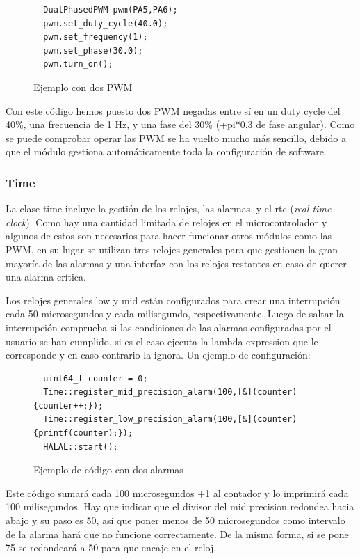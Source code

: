 \documentclass{report}
\begin{document}
\begin{figure}[h]
\begin{lstlisting}
  DualPhasedPWM pwm(PA5,PA6);
  pwm.set_duty_cycle(40.0);
  pwm.set_frequency(1);
  pwm.set_phase(30.0);
  pwm.turn_on();
\end{lstlisting}
\caption{Ejemplo con dos PWM}
  \label{PWMcode}
\end{figure}
\par \vspace{0.3 cm}
Con este código hemos puesto dos PWM negadas entre sí en un duty cycle del 40\%, una frecuencia de 1 Hz, y una fase del 30\% (+pi*0.3 de fase angular). Como se puede comprobar operar las PWM se ha vuelto mucho más sencillo, debido a que el módulo gestiona automáticamente toda la configuración de software.  

\subsubsection{Time}
La clase time incluye la gestión de los relojes, las alarmas, y el rtc (\textit{real time clock}). Como hay una cantidad limitada de relojes en el microcontrolador y algunos de estos son necesarios para hacer funcionar otros módulos como las PWM, en su lugar se utilizan tres relojes generales para que gestionen la gran mayoría de las alarmas y una interfaz con los relojes restantes en caso de querer una alarma crítica. \par
Los relojes generales low y mid están configurados para crear una interrupción cada 50 microsegundos y cada milisegundo, respectivamente. Luego de saltar la interrupción comprueba si las condiciones de las alarmas configuradas por el usuario se han cumplido, si es el caso ejecuta la lambda expression que le corresponde y en caso contrario la ignora. Un ejemplo de configuración:
\begin{figure}[h]
\begin{lstlisting}
  uint64_t counter = 0;
  Time::register_mid_precision_alarm(100,[&](counter){counter++;});
  Time::register_low_precision_alarm(100,[&](counter){printf(counter);});
  HALAL::start();
\end{lstlisting}
\caption{Ejemplo de código con dos alarmas}
  \label{Alarmcode}
\end{figure}
\par \vspace{0.3 cm}
Este código sumará cada 100 microsegundos +1 al contador y lo imprimirá cada 100 milisegundos. Hay que indicar que el divisor del mid precision redondea hacia abajo y su paso es 50, así que poner menos de 50 microsegundos como intervalo de la alarma hará que no funcione correctamente. De la misma forma, si se pone 75 se redondeará a 50 para que encaje en el reloj.  \par
\end{document}
